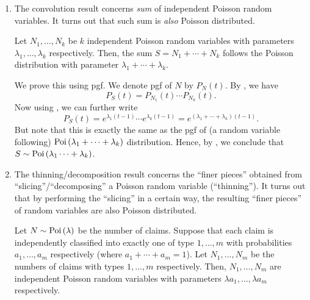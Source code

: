 \begin{enumerate}
\item The convolution result concerns \emph{sum} of independent Poisson random
variables. It turns out that such sum is \emph{also} Poisson distributed.
\begin{theorem}
\label{thm:pois-convolution}
Let \(N_1,\dotsc,N_k\) be \(k\) independent Poisson random variables with
parameters \(\lambda_1,\dotsc,\lambda_k\) respectively. Then, the sum
\(S=N_1+\dotsb+N_k\) follows the Poisson distribution with parameter
\(\lambda_1+\dotsb+\lambda_k\).
\end{theorem}
\begin{pf}
We prove this using pgf. We denote pgf of \(N\) by \(P_N(t)\).  By
, we have
\[
P_S(t)=P_{N_1}(t)\dotsb P_{N_k}(t).
\]
Now using , we can further write
\[
P_S(t)=e^{\lambda_1(t-1)}\dotsb e^{\lambda_k(t-1)}
=e^{(\lambda_1+\dotsb+\lambda_k)(t-1)}.
\]
But note that this is exactly the same as the pgf of (a random variable
following) \(\operatorname{Poi}\left(\lambda_1+\dotsb+\lambda_k\right)\) distribution. Hence, by
, we conclude that
\(S\sim\operatorname{Poi}\left(\lambda_1\dotsb+\lambda_k\right)\).
\end{pf}
\item The thinning/decomposition result concerns the ``finer pieces'' obtained
from ``slicing''/``decomposing'' a Poisson random variable (``thinning'').  It
turns out that by performing the ``slicing'' in a certain way, the resulting
``finer pieces'' of random variables are also Poisson distributed.

\begin{theorem}
\label{thm:pois-thinning}
Let \(N\sim\operatorname{Poi}\left(\lambda\right)\) be the number of claims. Suppose that each claim is
independently classified into exactly one of type \(1,\dotsc,m\) with
probabilities \(a_1,\dotsc,a_m\) respectively (where \(a_1+\dotsb+a_m=1\)). Let
\(N_1,\dotsc,N_m\) be the numbers of claims with types \(1,\dotsc,m\)
respectively. Then, \(N_1,\dotsc,N_m\) are independent Poisson random variables
with parameters \(\lambda a_1,\dotsc,\lambda a_m\) respectively.
\end{theorem}
\begin{center}
\end{center}
\end{enumerate}
